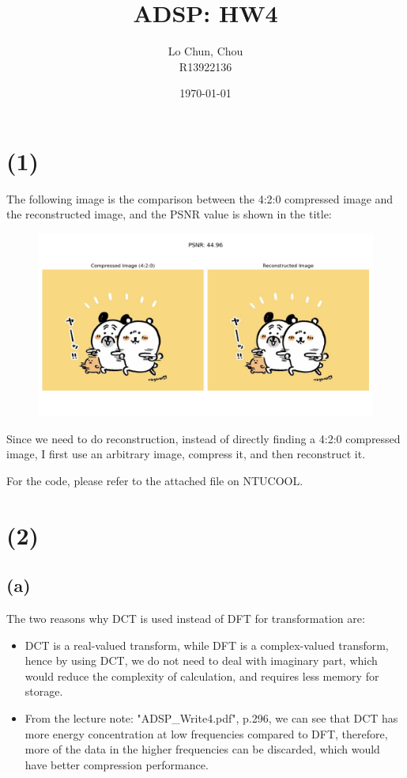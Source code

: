 \documentclass{article}
\title{ADSP: HW4}
\author{Lo Chun, Chou \\ R13922136}
\date\today
\begin{document}
\setlength{\parindent}{0pt}
\maketitle 

\section*{(1)}

The following image is the comparison between the 4:2:0 compressed image and the reconstructed image, 
and the PSNR value is shown in the title:

\begin{figure}[H]
    \centering
    \includegraphics[width=\textwidth]{problem_1/comparison.png}
\end{figure}

Since we need to do reconstruction, instead of directly finding a 4:2:0 compressed image,
I first use an arbitrary image, compress it, and then reconstruct it.
\bigskip

For the code, please refer to the attached file on NTUCOOL.

\section*{(2)}

\subsection*{(a)}

The two reasons why DCT is used instead of DFT for transformation are:

\begin{itemize}
    \item DCT is a real-valued transform, while DFT is a complex-valued transform, 
    hence by using DCT, we do not need to deal with imaginary part, 
    which would reduce the complexity of calculation, and requires less memory for storage.
    \item From the lecture note: "ADSP\_Write4.pdf", p.296, 
    we can see that DCT has more energy concentration at low frequencies compared to DFT,
    therefore, more of the data in the higher frequencies can be discarded,
    which would have better compression performance.
\end{itemize}
\end{document}
